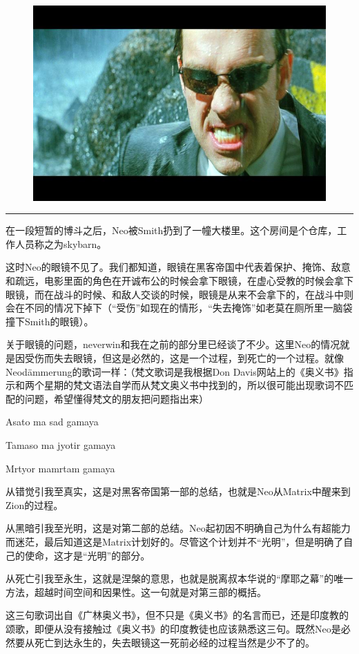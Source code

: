 \documentclass[UTF8]{ctexart}
\newcommand{\myparsep}{\noindent \rule[0.5ex]{\linewidth}{1pt}}
\newenvironment{myquote}{\color{green} \setlength{\leftskip}{6em} \setlength{\rightskip}{4em} \setlength{\parindent}{-2em}}{\par}
\begin{document}
\begin{figure}[htb]
\centering
\includegraphics[width=0.5\linewidth]{fig/ea5c6609c9fb42ce3ac7634d.jpg}
\end{figure}

\myparsep

在一段短暂的博斗之后，Neo被Smith扔到了一幢大楼里。这个房间是个仓库，工作人员称之为skybarn。

这时Neo的眼镜不见了。我们都知道，眼镜在黑客帝国中代表着保护、掩饰、敌意和疏远，电影里面的角色在开诚布公的时候会拿下眼镜，在虚心受教的时候会拿下眼镜，而在战斗的时候、和敌人交谈的时候，眼镜是从来不会拿下的，在战斗中则会在不同的情况下掉下（“受伤”如现在的情形，“失去掩饰”如老莫在厕所里一脑袋撞下Smith的眼镜）。

关于眼镜的问题，neverwin和我在之前的部分里已经谈了不少。这里Neo的情况就是因受伤而失去眼镜，但这是必然的，这是一个过程，到死亡的一个过程。就像Neodämmerung的歌词一样：（梵文歌词是我根据Don Davis网站上的《奥义书》指示和两个星期的梵文语法自学而从梵文奥义书中找到的，所以很可能出现歌词不匹配的问题，希望懂得梵文的朋友把问题指出来）

\begin{myquote}
Asato ma sad gamaya

Tamaso ma jyotir gamaya

Mrtyor mamrtam gamaya
\end{myquote}

从错觉引我至真实，这是对黑客帝国第一部的总结，也就是Neo从Matrix中醒来到Zion的过程。

从黑暗引我至光明，这是对第二部的总结。Neo起初因不明确自己为什么有超能力而迷茫，最后知道这是Matrix计划好的。尽管这个计划并不“光明”，但是明确了自己的使命，这才是“光明”的部分。

从死亡引我至永生，这就是涅槃的意思，也就是脱离叔本华说的“摩耶之幕”的唯一方法，超越时间空间和因果性。这一句就是对第三部的概括。

这三句歌词出自《广林奥义书》，但不只是《奥义书》的名言而已，还是印度教的颂歌，即便从没有接触过《奥义书》的印度教徒也应该熟悉这三句。既然Neo是必然要从死亡到达永生的，失去眼镜这一死前必经的过程当然是少不了的。
\end{document}
